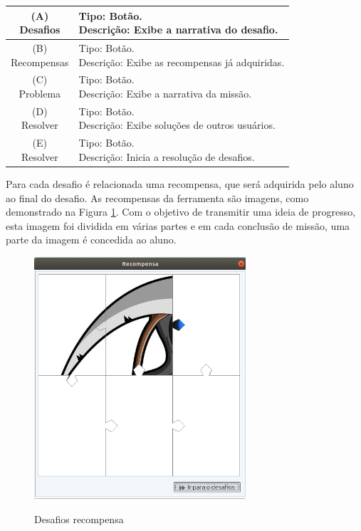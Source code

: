 \documentclass[
	12pt,				%
	oneside,			%
	a4paper,			%
	english,			%
	french,				%
	spanish,			%
	brazil,				%
	]{abntex2}
\begin{document}
\begin{table}[H]
\centering
{} \label{tab:listagemMissoes}
\renewcommand{\arraystretch}{1.8}
\setlength{\tabcolsep}{10pt}
\begin{tabular}{|c|l|}
  \hline
  \makecell{(A) \\ Desafios} 
  &
  \makecell[l]{Tipo: Botão.\\ Descrição: Exibe a narrativa do desafio.} \\
  \hline
  \makecell{(B) \\ Recompensas} 
  &
  \makecell[l]{Tipo: Botão.\\ Descrição: Exibe as recompensas já adquiridas.} \\
  \hline
  \makecell{(C) \\ Problema} 
  &
  \makecell[l]{Tipo: Botão.\\ Descrição: Exibe a narrativa da missão.} \\
  \hline  
  \makecell{(D) \\ Resolver} 
  &
  \makecell[l]{Tipo: Botão.\\ Descrição: Exibe soluções de outros usuários.} \\
  \hline  
  \makecell{(E) \\ Resolver} 
  &
  \makecell[l]{Tipo: Botão.\\ Descrição: Inicia a resolução de desafios.} \\
  \hline  
\end{tabular}
\centering
\sourceAuthor
\end{table}


Para cada desafio é relacionada uma recompensa, que será adquirida pelo aluno ao final do desafio. As recompensas da ferramenta são imagens, como demonstrado na Figura \ref{fig:visnodeDesafiosRecompensa}. Com o objetivo de transmitir uma ideia de progresso, esta imagem foi dividida em várias partes e em cada conclusão de missão, uma parte da imagem é concedida ao aluno.

\begin{figure}[H]
\centering
\caption{Desafios recompensa}
\includegraphics[width=0.7\textwidth]{imagens/visnode_desafios_recompensa.png}
\sourceAuthor
\label{fig:visnodeDesafiosRecompensa}
\end{figure}
\end{document}
